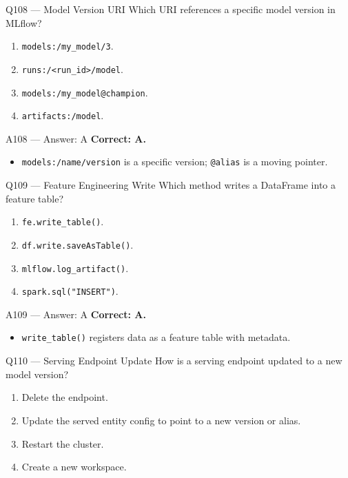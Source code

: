 \documentclass[aspectratio=169,9pt]{beamer}
\begin{document}
	\begin{frame}{Q108 --- Model Version URI}
		Which URI references a specific model version in MLflow?
		\begin{enumerate}[label=\Alph*.]
			\item \texttt{models:/my\_model/3}.
			\item \texttt{runs:/<run\_id>/model}.
			\item \texttt{models:/my\_model@champion}.
			\item \texttt{artifacts:/model}.
		\end{enumerate}
	\end{frame}
	
	\begin{frame}{A108 --- Answer: A}
		\textbf{Correct: A.}
		\begin{itemize}
			\item \texttt{models:/name/version} is a specific version; \texttt{@alias} is a moving pointer.
		\end{itemize}
	\end{frame}
	
	\begin{frame}{Q109 --- Feature Engineering Write}
		Which method writes a DataFrame into a feature table?
		\begin{enumerate}[label=\Alph*.]
			\item \texttt{fe.write\_table()}.
			\item \texttt{df.write.saveAsTable()}.
			\item \texttt{mlflow.log\_artifact()}.
			\item \texttt{spark.sql("INSERT")}.
		\end{enumerate}
	\end{frame}
	
	\begin{frame}{A109 --- Answer: A}
		\textbf{Correct: A.}
		\begin{itemize}
			\item \texttt{write\_table()} registers data as a feature table with metadata.
		\end{itemize}
	\end{frame}
	
	\begin{frame}{Q110 --- Serving Endpoint Update}
		How is a serving endpoint updated to a new model version?
		\begin{enumerate}[label=\Alph*.]
			\item Delete the endpoint.
			\item Update the served entity config to point to a new version or alias.
			\item Restart the cluster.
			\item Create a new workspace.
		\end{enumerate}
	\end{frame}
	
\end{document}
